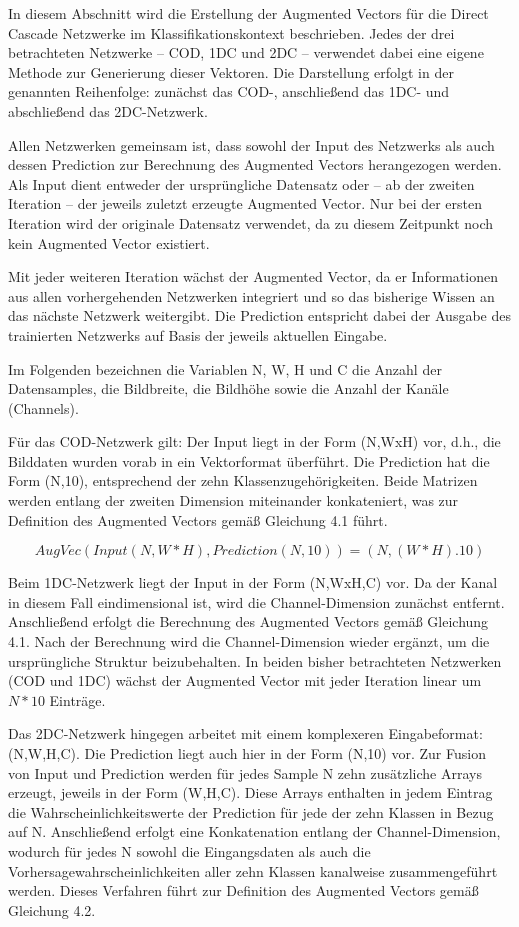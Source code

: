 In diesem Abschnitt wird die Erstellung der Augmented Vectors für die Direct Cascade Netzwerke im Klassifikationskontext beschrieben. Jedes der 
drei betrachteten Netzwerke – COD, 1DC und 2DC – verwendet dabei eine eigene Methode zur Generierung dieser Vektoren. Die Darstellung erfolgt in 
der genannten Reihenfolge: zunächst das COD-, anschließend das 1DC- und abschließend das 2DC-Netzwerk.

Allen Netzwerken gemeinsam ist, dass sowohl der Input des Netzwerks als auch dessen Prediction zur Berechnung des Augmented Vectors 
herangezogen werden. Als Input dient entweder der ursprüngliche Datensatz oder – ab der zweiten Iteration – der jeweils zuletzt erzeugte Augmented 
Vector. Nur bei der ersten Iteration wird der originale Datensatz verwendet, da zu diesem Zeitpunkt noch kein Augmented Vector existiert.

Mit jeder weiteren Iteration wächst der Augmented Vector, da er Informationen aus allen vorhergehenden Netzwerken integriert und so das bisherige 
Wissen an das nächste Netzwerk weitergibt. Die Prediction entspricht dabei der Ausgabe des trainierten Netzwerks auf Basis der 
jeweils aktuellen Eingabe.

Im Folgenden bezeichnen die Variablen N, W, H und C die Anzahl der Datensamples, die Bildbreite, die Bildhöhe sowie die Anzahl der Kanäle 
(Channels).

Für das COD-Netzwerk gilt: Der Input liegt in der Form (N,WxH) vor, d.h., die Bilddaten wurden vorab in ein Vektorformat 
überführt. Die Prediction hat die Form (N,10), entsprechend der zehn Klassenzugehörigkeiten. Beide Matrizen werden entlang der zweiten 
Dimension miteinander konkateniert, was zur Definition des Augmented Vectors gemäß Gleichung 4.1 führt.

\begin{equation}
    AugVec(Input(N, W*H), Prediction(N, 10)) = (N, (W*H).10)
\end{equation}

Beim 1DC-Netzwerk liegt der Input in der Form (N,WxH,C) vor. Da der Kanal in diesem Fall eindimensional ist, wird die Channel-Dimension 
zunächst entfernt. Anschließend erfolgt die Berechnung des Augmented Vectors gemäß Gleichung 4.1. Nach der Berechnung wird die Channel-Dimension 
wieder ergänzt, um die ursprüngliche Struktur beizubehalten. In beiden bisher betrachteten Netzwerken (COD und 1DC) wächst der Augmented Vector 
mit jeder Iteration linear um $N * 10$ Einträge.

Das 2DC-Netzwerk hingegen arbeitet mit einem komplexeren Eingabeformat: (N,W,H,C). Die Prediction liegt auch hier in der 
Form (N,10) vor. Zur Fusion von Input und Prediction werden für jedes Sample N zehn zusätzliche Arrays erzeugt, jeweils in der 
Form (W,H,C). Diese Arrays enthalten in jedem Eintrag die Wahrscheinlichkeitswerte der Prediction für jede der zehn Klassen in Bezug auf N. 
Anschließend erfolgt eine Konkatenation entlang der Channel-Dimension, wodurch für jedes N sowohl die Eingangsdaten als auch die 
Vorhersagewahrscheinlichkeiten aller zehn Klassen kanalweise zusammengeführt werden. Dieses Verfahren 
führt zur Definition des Augmented Vectors gemäß Gleichung 4.2.

